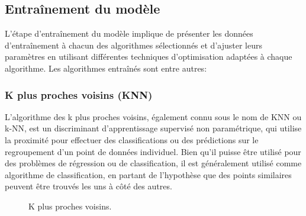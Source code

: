 \subsection{Entraînement du modèle}
L'étape d'entraînement du modèle implique de présenter les données d'entraînement à chacun des algorithmes sélectionnés et d'ajuster leurs paramètres en utilisant différentes techniques d'optimisation adaptées à chaque algorithme.
Les algorithmes entraînés sont entre autres:

\subsubsection{K plus proches voisins (KNN)}
L'algorithme des k plus proches voisins, également connu sous le nom de KNN ou k-NN, est un discriminant d'apprentissage supervisé non paramétrique, qui utilise la proximité pour effectuer des classifications ou des prédictions sur le regroupement d'un point de données individuel. Bien qu'il puisse être utilisé pour des problèmes de régression ou de classification, il est généralement utilisé comme algorithme de classification, en partant de l'hypothèse que des points similaires peuvent être trouvés les uns à côté des autres.
\begin{figure}[H]%
    \center%
    \setlength{\fboxsep}{5pt}%
    \setlength{\fboxrule}{0.5pt}%
    \caption{K plus proches voisins.}%
\end{figure}


